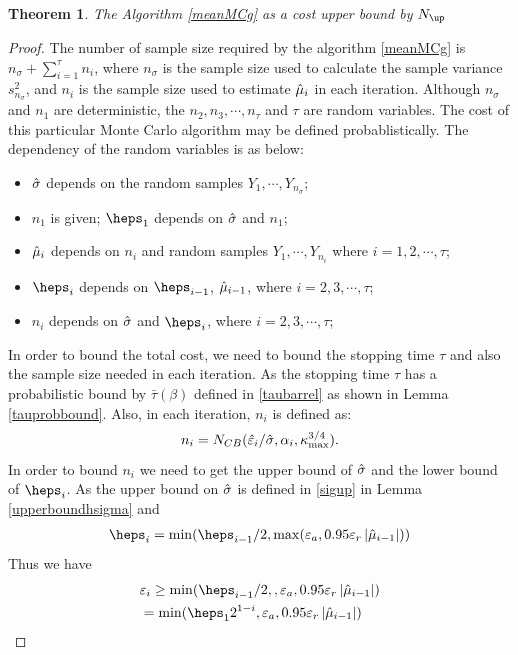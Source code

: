 \documentclass{iitthesis}
\newtheorem{theorem}{Theorem}[section]
\begin{document}
\begin{theorem}
The Algorithm \ref{meanMCg} as a cost upper bound by $N_{\up}$
\end{theorem}
\begin{proof}
The number of sample size required by the algorithm \ref{meanMCg} is $n_{\sigma}+\sum_{i=1}^\tau n_i$, where $n_\sigma$ is the sample size used to calculate the sample variance $s_{n_\sigma}^2$, and $n_i$ is the sample size used to estimate $\hat{\mu}_i$ in each iteration.
 Although $n_{\sigma}$ and $n_1$ are deterministic, the $n_2, n_3,\cdots, n_\tau$ and $\tau$ are random variables. The cost of this particular Monte Carlo algorithm may be defined probablistically. The dependency of the random variables is as below:
 \begin{itemize}
 \item $\hat{\sigma}$ depends on the random samples $Y_1,\cdots, Y_{n_\sigma}$;
 \item $n_1$ is given; $\heps_1$ depends on $\hat{\sigma}$ and $n_1$; 
  \item $\hat{\mu}_i$ depends on $n_i$ and random samples $Y_1, \cdots, Y_{n_i}$ where $i = 1,2,\cdots,\tau$;
 \item $\heps_i$ depends on $\heps_{i-1}$, $\hat{\mu}_{i-1}$, where $i = 2,3,\cdots,\tau$;
 \item $n_i$ depends on  $\hat{\sigma}$ and $\heps_i$, where  $i = 2,3,\cdots,\tau$;
 \end{itemize}
 In order to bound the total cost, we need to bound the stopping time $\tau$ and also the sample size needed in each iteration. As the stopping time $\tau$ has a probabilistic bound by $\bar{\tau}(\beta)$ defined in \eqref{taubarrel} as shown in Lemma \eqref{tauprobbound}. Also, in each iteration, $n_i$ is defined as:
$$n_{i} = N_{CB}(\hat{\varepsilon}_{i}/\hat{\sigma},\alpha_{i},\kappa_{\max}^{3/4}).$$
In order to bound $n_i$ we need to get the upper bound of $\hat{\sigma}$ and the lower bound of $\heps_i$. As the upper bound on $\hat{\sigma}$ is defined in \eqref{sigup} in Lemma \ref{upperboundhsigma} and 
\begin{align}
\heps_i= \min(\heps_{i-1}/2, \max(\varepsilon_a,0.95\varepsilon_r\abs{\hmu_{i-1}}))
\end{align}
Thus we have 
\begin{align}
&\varepsilon_i \geq  \min(\heps_{i-1}/2,,\varepsilon_a,0.95\varepsilon_r\abs{\hmu_{i-1}})\\
& = \min(\heps_12^{1-i},\varepsilon_a,0.95\varepsilon_r\abs{\hmu_{i-1}})\\

\end{align}
\end{proof}
\end{document}
